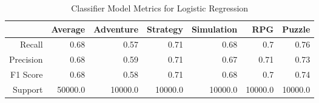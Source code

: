 \begin{table}[h]
    \centering
    \begin{tabular}{r|r|r|r|r|r|r}
        & Average & Adventure & Strategy & Simulation & RPG & Puzzle \\\hline
        Recall      & 0.68 & 0.57 & 0.71 & 0.68 & 0.7 & 0.76\\
        Precision   & 0.68 & 0.59 & 0.71 & 0.67 & 0.71 & 0.73\\
        F1 Score    & 0.68 & 0.58 & 0.71 & 0.68 & 0.7 & 0.74\\
        Support     & 50000.0 & 10000.0 & 10000.0 & 10000.0 & 10000.0 & 10000.0
\end{tabular}
    \caption{Classifier Model Metrics for Logistic Regression}
    \label{tab:model_metrics}
\end{table}